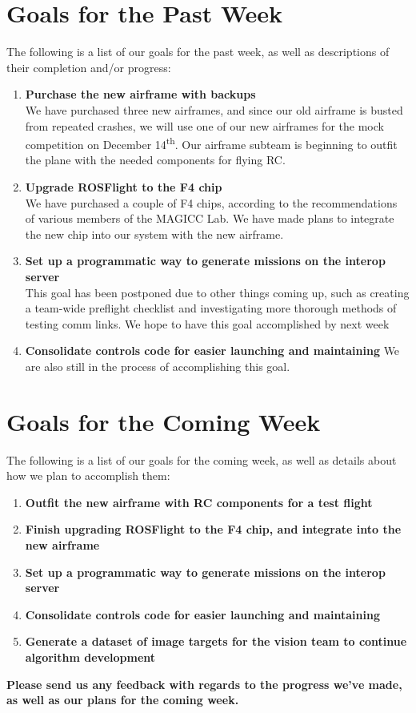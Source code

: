 \documentclass[]{../auvsi_doc}
\begin{document}
\section{Goals for the Past Week}

The following is a list of our goals for the past week, as well as descriptions of their completion and/or progress:

\begin{enumerate}
\item \textbf{Purchase the new airframe with backups}\\
We have purchased three new airframes, and since our old airframe is busted from repeated crashes, we will use one of our new airframes for the mock competition on December 14\textsuperscript{th}. Our airframe subteam is beginning to outfit the plane with the needed components for flying RC.
\item \textbf{Upgrade ROSFlight to the F4 chip}\\
We have purchased a couple of F4 chips, according to the recommendations of various members of the MAGICC Lab. We have made plans to integrate the new chip into our system with the new airframe.
\item \textbf{Set up a programmatic way to generate missions on the interop server}\\
This goal has been postponed due to other things coming up, such as creating a team-wide preflight checklist and investigating more thorough methods of testing comm links. We hope to have this goal accomplished by next week
\item \textbf{Consolidate controls code for easier launching and maintaining}
We are also still in the process of accomplishing this goal.
\end{enumerate}

\section{Goals for the Coming Week}

The following is a list of our goals for the coming week, as well as details about how we plan to accomplish them:

\begin{enumerate}
\item \textbf{Outfit the new airframe with RC components for a test flight}
\item \textbf{Finish upgrading ROSFlight to the F4 chip, and integrate into the new airframe}
\item \textbf{Set up a programmatic way to generate missions on the interop server}
\item \textbf{Consolidate controls code for easier launching and maintaining}
\item \textbf{Generate a dataset of image targets for the vision team to continue algorithm development}
\end{enumerate}

\textbf{Please send us any feedback with regards to the progress we've made, as well as our plans for the coming week.}
\end{document}
